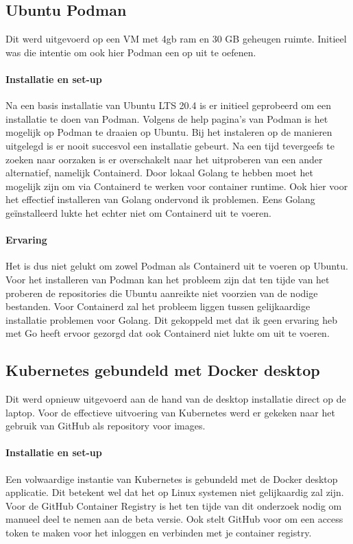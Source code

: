 \subsection{Ubuntu Podman}
Dit werd uitgevoerd op een VM met 4gb ram en 30 GB geheugen ruimte. Initieel was die intentie om ook hier Podman een op uit te oefenen.

\paragraph{Installatie en set-up}
Na een basis installatie van Ubuntu LTS 20.4 is er initieel geprobeerd om een installatie te doen van Podman. Volgens de help pagina’s van Podman is het mogelijk op Podman te draaien op Ubuntu. Bij het instaleren op de manieren uitgelegd is er nooit succesvol een installatie gebeurt. Na een tijd tevergeefs te zoeken naar oorzaken is er overschakelt naar het uitproberen van een ander alternatief, namelijk Containerd.
Door lokaal Golang te hebben moet het mogelijk zijn om via Containerd te werken voor container runtime. Ook hier voor het effectief installeren van Golang ondervond ik problemen.  Eens Golang geïnstalleerd lukte het echter niet om Containerd uit te voeren.

\paragraph{Ervaring}
Het is dus niet gelukt om zowel Podman als Containerd uit te voeren op Ubuntu. Voor het installeren van Podman kan het probleem zijn dat ten tijde van het proberen de repositories die Ubuntu aanreikte niet voorzien van de nodige bestanden. Voor Containerd zal het probleem liggen tussen gelijkaardige installatie problemen voor Golang. Dit gekoppeld met dat ik geen ervaring heb met Go heeft ervoor gezorgd dat ook Containerd niet lukte om uit te voeren.

\subsection{Kubernetes gebundeld met Docker desktop}
Dit werd opnieuw uitgevoerd aan de hand van de desktop installatie direct op de laptop. Voor de effectieve uitvoering van Kubernetes werd er gekeken naar het gebruik van GitHub als repository voor images.
\paragraph{Installatie en set-up}
Een volwaardige instantie van Kubernetes is gebundeld met de Docker desktop applicatie. Dit betekent wel dat het op Linux systemen niet gelijkaardig zal zijn.
Voor de GitHub Container Registry is het ten tijde van dit onderzoek nodig om manueel deel te nemen aan de beta versie. Ook stelt GitHub voor om een access token te maken voor het inloggen en verbinden met je container registry.

